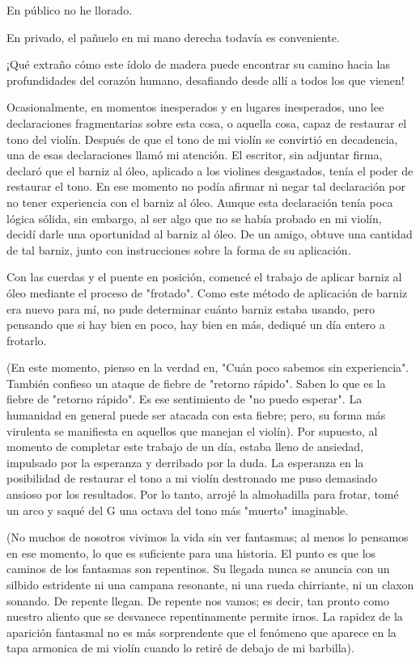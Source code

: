 \documentclass[12pt]{book}
\begin{document}
En público no he llorado.

En privado, el pañuelo en mi mano derecha todavía es conveniente.

¡Qué extraño cómo este ídolo de madera puede encontrar su camino hacia las profundidades del corazón humano, desafiando desde allí a todos los que vienen!

Ocasionalmente, en momentos inesperados y en lugares inesperados, uno lee declaraciones fragmentarias sobre esta cosa, o aquella cosa, capaz de restaurar el tono del violín. Después de que el tono de mi violín se convirtió en decadencia, una de esas declaraciones llamó mi atención. El escritor, sin adjuntar firma, declaró que el barniz al óleo, aplicado a los violines desgastados, tenía el poder de restaurar el tono. En ese momento no podía afirmar ni negar tal declaración por no tener experiencia con el barniz al óleo. Aunque esta declaración tenía poca lógica sólida, sin embargo, al ser algo que no se había probado en mi violín, decidí darle una oportunidad al barniz al óleo. De un amigo, obtuve una cantidad de tal barniz, junto con instrucciones sobre la forma de su aplicación.

Con las cuerdas y el puente en posición, comencé el trabajo de aplicar barniz al óleo mediante el proceso de "frotado". Como este método de aplicación de barniz era nuevo para mí, no pude determinar cuánto barniz estaba usando, pero pensando que si hay bien en poco, hay bien en más, dediqué un día entero a frotarlo.

(En este momento, pienso en la verdad en, "Cuán poco sabemos sin experiencia". También confieso un ataque de fiebre de "retorno rápido". Saben lo que es la fiebre de "retorno rápido". Es ese sentimiento de "no puedo esperar". La humanidad en general puede ser atacada con esta fiebre; pero, su forma más virulenta se manifiesta en aquellos que manejan el violín). Por supuesto, al momento de completar este trabajo de un día, estaba lleno de ansiedad, impulsado por la esperanza y derribado por la duda. La esperanza en la posibilidad de restaurar el tono a mi violín destronado me puso demasiado ansioso por los resultados. Por lo tanto, arrojé la almohadilla para frotar, tomé un arco y saqué del G una octava del tono más "muerto" imaginable.

(No muchos de nosotros vivimos la vida sin ver fantasmas; al menos lo pensamos en ese momento, lo que es suficiente para una historia. El punto es que los caminos de los fantasmas son repentinos. Su llegada nunca se anuncia con un silbido estridente ni una campana resonante, ni una rueda chirriante, ni un claxon sonando. De repente llegan. De repente nos vamos; es decir, tan pronto como nuestro aliento que se desvanece repentinamente permite irnos. La rapidez de la aparición fantasmal no es más sorprendente que el fenómeno que aparece en la tapa armonica de mi violín cuando lo retiré de debajo de mi barbilla).
\end{document}
